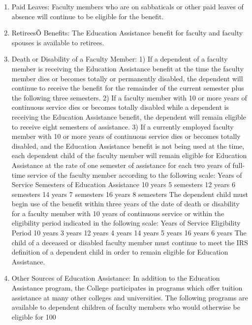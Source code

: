 \documentclass[letterpaper, 11pt]{article}
\begin{document}
\begin{enumerate}[label=\alph*)]
					\item{Paid Leaves:}
					Faculty members who are on sabbaticals or other paid leaves of absence will continue to be eligible for the benefit.
					\item{RetireesÕ Benefits:}
					The Education Assistance benefit for faculty and faculty spouses is available to retirees.
					\item{Death or Disability of a Faculty Member:}
					1) If a dependent of a faculty member is receiving the Education Assistance benefit at the time the faculty member dies or becomes totally or permanently disabled, the dependent will continue to receive the benefit for the remainder of the current semester plus the following three semesters.
					2) If a faculty member with 10 or more years of continuous service dies or becomes totally disabled while a dependent is receiving the Education Assistance benefit, the dependent will remain eligible to receive eight semesters of assistance.
					3) If a currently employed faculty member with 10 or more years of continuous service dies or becomes totally disabled, and the Education Assistance benefit is not being used at the time, each dependent child of the faculty member will remain eligible for Education Assistance at the rate of one semester of assistance for each two years of full-time service of the faculty member according to the following scale:
					Years of Service			Semesters of Education Assistance
					10 years				5 semesters
					12 years				6 semesters
					14 years				7 semesters
					16 years				8 semesters
					The dependent child must begin use of the benefit within three years of the date of death or disability for a faculty member with 10 years of continuous service or within the eligibility period indicated in the following scale:
					Years of Service			Eligibility Period
					10 years				3 years
					12 years				4 years
					14 years				5 years
					16 years				6 years
					The child of a deceased or disabled faculty member must continue to meet the IRS definition of a dependent child in order to remain eligible for Education Assistance.
					\item{Other Sources of Education Assistance:}
					In addition to the Education Assistance program, the College participates in programs which offer tuition assistance at many other colleges and universities.  The following programs are available to dependent children of faculty members who would otherwise be eligible for 100%

\end{enumerate}
\end{document}

